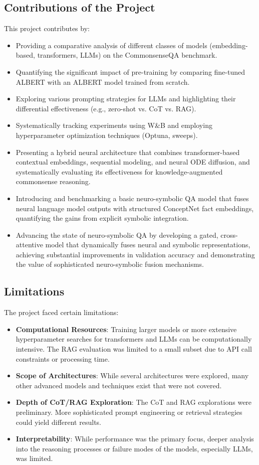 \documentclass[10.5pt]{article}
\begin{document}
\subsection{Contributions of the Project}
This project contributes by:
\begin{itemize}
    \item Providing a comparative analysis of different classes of models (embedding-based, transformers, LLMs) on the CommonsenseQA benchmark.
    \item Quantifying the significant impact of pre-training by comparing fine-tuned ALBERT with an ALBERT model trained from scratch.
    \item Exploring various prompting strategies for LLMs and highlighting their differential effectiveness (e.g., zero-shot vs. CoT vs. RAG).
    \item Systematically tracking experiments using W\&B and employing hyperparameter optimization techniques (Optuna, sweeps).
    \item Presenting a hybrid neural architecture that combines transformer-based contextual embeddings, sequential modeling, and neural ODE diffusion, and systematically evaluating its effectiveness for knowledge-augmented commonsense reasoning.
    \item Introducing and benchmarking a basic neuro-symbolic QA model that fuses neural language model outputs with structured ConceptNet fact embeddings, quantifying the gains from explicit symbolic integration.
    \item Advancing the state of neuro-symbolic QA by developing a gated, cross-attentive model that dynamically fuses neural and symbolic representations, achieving substantial improvements in validation accuracy and demonstrating the value of sophisticated neuro-symbolic fusion mechanisms.
\end{itemize}

\subsection{Limitations}
The project faced certain limitations:
\begin{itemize}
    \item \textbf{Computational Resources}: Training larger models or more extensive hyperparameter searches for transformers and LLMs can be computationally intensive. The RAG evaluation was limited to a small subset due to API call constraints or processing time.
    \item \textbf{Scope of Architectures}: While several architectures were explored, many other advanced models and techniques exist that were not covered.
    \item \textbf{Depth of CoT/RAG Exploration}: The CoT and RAG explorations were preliminary. More sophisticated prompt engineering or retrieval strategies could yield different results.
    \item \textbf{Interpretability}: While performance was the primary focus, deeper analysis into the reasoning processes or failure modes of the models, especially LLMs, was limited.
\end{itemize}
\end{document}
